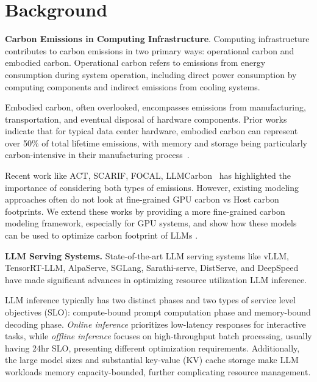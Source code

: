 \section{Background}



\textbf{Carbon Emissions in Computing Infrastructure}. Computing infrastructure contributes to carbon emissions in two primary ways: operational carbon and embodied carbon. Operational carbon refers to emissions from energy consumption during system operation, including direct power consumption by computing components and indirect emissions from cooling systems. 

Embodied carbon, often overlooked, encompasses emissions from manufacturing, transportation, and eventual disposal of hardware components. Prior works indicate that for typical data center hardware, embodied carbon can represent over 50\% of total lifetime emissions, with memory and storage being particularly carbon-intensive in their manufacturing process~\cite{greensku, dirty_ssd, gupta2021chasing}.


Recent work like ACT, SCARIF, FOCAL, LLMCarbon~\cite{ACT,SCARIF,faiz2023llmcarbon,eeckhout2024focal} has highlighted the importance of considering both types of emissions. However, existing modeling approaches often do not look at fine-grained GPU carbon vs Host carbon footprints. We extend these works by providing a more fine-grained carbon modeling framework, especially for GPU systems, and show how these models can be used to optimize carbon footprint of LLMs    .






\textbf{LLM Serving Systems.}
State-of-the-art LLM serving systems like vLLM, TensorRT-LLM, AlpaServe, SGLang, Sarathi-serve, DistServe, and DeepSpeed~\cite{Deepspeed,kwon2023efficient,agrawal2024taming,zhong2024distserve,patel2023splitwise,zheng2023efficiently,TensorRT,alpaserve} have made significant advances in optimizing resource utilization LLM inference.


LLM inference typically has two distinct phases and two types of service level objectives (SLO): compute-bound prompt computation phase and memory-bound decoding phase. 
\textit{Online inference} prioritizes low-latency responses for interactive tasks, while \textit{offline inference} focuses on high-throughput batch processing, usually having 24hr SLO, presenting different optimization requirements. Additionally, the large model sizes and substantial key-value (KV) cache storage make LLM workloads memory capacity-bounded, further complicating resource management.

